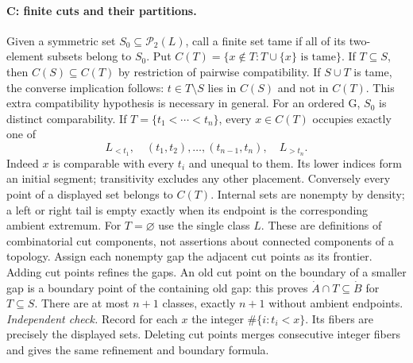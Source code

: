 \paragraph{C: finite cuts and their partitions.}\label{lem:cuts}
Given a symmetric set $S_0\subseteq\mathcal P_2(L)$, call a finite set tame if all of its two-element subsets belong to $S_0$. Put
$C(T)=\{x\notin T:T\cup\{x\}\text{ is tame}\}$.
If $T\subseteq S$, then $C(S)\subseteq C(T)$ by restriction of pairwise compatibility. If $S\cup T$ is tame, the converse implication follows: $t\in T\setminus S$ lies in $C(S)$ and not in $C(T)$. This extra compatibility hypothesis is necessary in general.
For an ordered G, $S_0$ is distinct comparability. If $T=\{t_1<\cdots<t_n\}$, every $x\in C(T)$ occupies exactly one of
\[
 L_{<t_1},\quad (t_1,t_2),\ldots,(t_{n-1},t_n),\quad L_{>t_n}.
\]
Indeed $x$ is comparable with every $t_i$ and unequal to them. Its lower indices form an initial segment; transitivity excludes any other placement. Conversely every point of a displayed set belongs to $C(T)$. Internal sets are nonempty by density; a left or right tail is empty exactly when its endpoint is the corresponding ambient extremum. For $T=\varnothing$ use the single class $L$. These are definitions of combinatorial cut components, not assertions about connected components of a topology. Assign each nonempty gap the adjacent cut points as its frontier. Adding cut points refines the gaps. An old cut point on the boundary of a smaller gap is a boundary point of the containing old gap: this proves $\dot A\cap T\subseteq\dot B$ for $T\subseteq S$. There are at most $n+1$ classes, exactly $n+1$ without ambient endpoints.
\emph{Independent check.} Record for each $x$ the integer $\#\{i:t_i<x\}$. Its fibers are precisely the displayed sets. Deleting cut points merges consecutive integer fibers and gives the same refinement and boundary formula.

